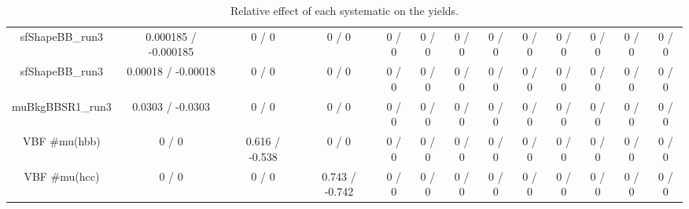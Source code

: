 \documentclass[10pt]{article}
\begin{document}
\begin{table}[htbp]
\begin{center}
\begin{tabular}{|c|c|c|c|c|c|c|c|c|c|c|c|c|}
  sfShapeBB_run3 & 0.000185 / -0.000185 & 0 / 0 & 0 / 0 & 0 / 0 & 0 / 0 & 0 / 0 & 0 / 0 & 0 / 0 & 0 / 0 & 0 / 0 & 0 / 0 & 0 / 0 \\ 
  sfShapeBB_run3 & 0.00018 / -0.00018 & 0 / 0 & 0 / 0 & 0 / 0 & 0 / 0 & 0 / 0 & 0 / 0 & 0 / 0 & 0 / 0 & 0 / 0 & 0 / 0 & 0 / 0 \\ 
  muBkgBBSR1_run3 & 0.0303 / -0.0303 & 0 / 0 & 0 / 0 & 0 / 0 & 0 / 0 & 0 / 0 & 0 / 0 & 0 / 0 & 0 / 0 & 0 / 0 & 0 / 0 & 0 / 0 \\ 
  VBF #mu(hbb) & 0 / 0 & 0.616 / -0.538 & 0 / 0 & 0 / 0 & 0 / 0 & 0 / 0 & 0 / 0 & 0 / 0 & 0 / 0 & 0 / 0 & 0 / 0 & 0 / 0 \\ 
  VBF #mu(hcc) & 0 / 0 & 0 / 0 & 0.743 / -0.742 & 0 / 0 & 0 / 0 & 0 / 0 & 0 / 0 & 0 / 0 & 0 / 0 & 0 / 0 & 0 / 0 & 0 / 0 \\ 
\hline 
\end{tabular} 
\caption{Relative effect of each systematic on the yields.} 
\end{center} 
\end{table} 
\end{document}
